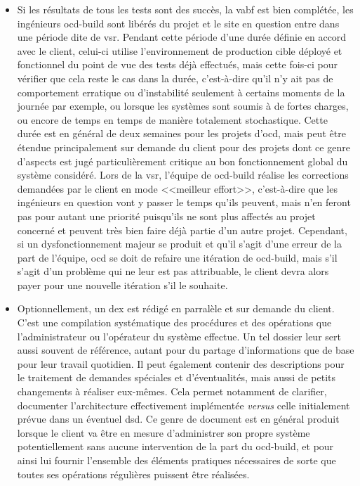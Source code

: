 \documentclass[12pt, oneside, a4paper, titlepage]{report}
\begin{document}
\begin{itemize}
    \item Si les résultats de tous les tests sont des succès, la \gls{vabf} est
        bien complétée, les ingénieurs \gls{ocd-build} sont libérés du projet et
        le site en question entre dans une période dite de \gls{vsr}. Pendant
        cette période d'une durée définie en accord avec le client, celui-ci
        utilise l'environnement de production cible déployé et fonctionnel du
        point de vue des tests déjà effectués, mais cette fois-ci pour vérifier
        que cela reste le cas dans la durée, c'est-à-dire qu'il n'y ait pas de
        comportement erratique ou d'instabilité seulement à certains moments de
        la journée par exemple, ou lorsque les systèmes sont soumis à de fortes
        charges, ou encore de temps en temps de manière totalement stochastique.
        Cette durée est en général de deux semaines pour les projets
        d'\acrlong{ocd}, mais peut être étendue principalement sur demande du
        client pour des projets dont ce genre d'aspects est jugé
        particulièrement critique au bon fonctionnement global du système
        considéré. Lors de la \gls{vsr}, l'équipe de \gls{ocd-build} réalise les
        corrections demandées par le client en mode <<meilleur effort>>,
        c'est-à-dire que les ingénieurs en question vont y passer le temps
        qu'ils peuvent, mais n'en feront pas pour autant une priorité puisqu'ils
        ne sont plus affectés au projet concerné et peuvent très bien faire déjà
        partie d'un autre projet. Cependant, si un dysfonctionnement majeur se
        produit et qu'il s'agit d'une erreur de la part de l'équipe, \gls{ocd}
        se doit de refaire une itération de \gls{ocd-build}, mais s'il s'agit
        d'un problème qui ne leur est pas attribuable, le client devra alors
        payer pour une nouvelle itération s'il le souhaite.

    \item Optionnellement, un \gls{dex} est rédigé en parralèle et sur demande
        du client. C'est une compilation systématique des procédures et des
        opérations que l'administrateur ou l'opérateur du système effectue. Un
        tel dossier leur sert aussi souvent de référence, autant pour du partage
        d'informations que de base pour leur travail quotidien. Il peut
        également contenir des descriptions pour le traitement de demandes
        spéciales et d'éventualités, mais aussi de petits changements à réaliser
        eux-mêmes. Cela permet notamment de clarifier, documenter l'architecture
        effectivement implémentée \textit{versus} celle initialement prévue dans
        un éventuel \gls{dsd}. Ce genre de document est en général produit
        lorsque le client va être en mesure d'administrer son propre système
        potentiellement sans aucune intervention de la part du \gls{ocd-build},
        et pour ainsi lui fournir l'ensemble des éléments pratiques nécessaires
        de sorte que toutes ses opérations régulières puissent être réalisées.


\end{itemize}
\end{document}
